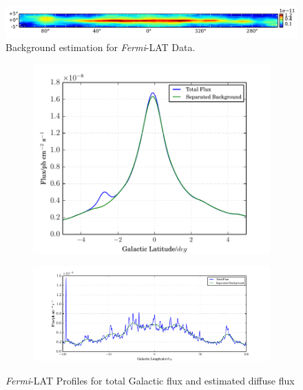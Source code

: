 \documentclass{PoS}
\begin{document}
\begin{figure}
  \begin{center}
      \includegraphics[width=\textwidth]{figures/BG_DATA.pdf}
  \caption{Background estimation for \textit{Fermi}-LAT Data.}
  \end{center}
\end{figure}

\begin{figure}
\centering
\begin{subfigure}{0.33\textwidth}
      \includegraphics[width=\textwidth]{figures/GLAT.pdf}
\end{subfigure}
\begin{subfigure}{0.66\textwidth}
        \includegraphics[width=\textwidth]{figures/GLON.pdf}
\end{subfigure}
\caption{\textit{Fermi}-LAT Profiles for total Galactic flux and estimated diffuse flux}
\end{figure}
\end{document}
